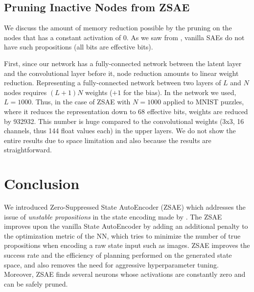 \subsection{Pruning Inactive Nodes from ZSAE}


We discuss the amount of memory reduction possible by the pruning on the nodes
that has a constant activation of 0. As we saw from ,
vanilla SAEs do not have such propositions (all bits are effective bits).

First, since our network has a fully-connected network between the
latent layer and the convolutional layer before it, node reduction
amounts to linear weight reduction.  Representing a fully-connected
network between two layers of $L$ and $N$ nodes requires $(L+1)N$
weights ($+1$ for the bias).
In the network we used, $L=1000$. Thus, in the case of ZSAE with $N=1000$ applied to MNIST puzzles,
where it reduces the representation down to 68 effective bits, weights are reduced by 932932.
This number is huge compared to the convolutional weights (3x3, 16 channels, thus 144 float values each) in the upper layers.
We do not show the entire results due to space limitation and also because the results are straightforward.


\section{Conclusion}
\label{conclusion}

We introduced Zero-Suppressed State AutoEncoder (ZSAE) which addresses
the issue of \emph{unstable propositions} in the state encoding made by
\latentplanner.
% 
The ZSAE improves upon the
vanilla State AutoEncoder \cite[SAE]{Asai2018} by
adding an additional penalty to the optimization metric of
the NN, which tries to minimize the number of true propositions
when encoding a raw state input such as images.
% 
ZSAE improves the success rate and the efficiency of planning performed on
the generated state space, and also removes the need for aggressive
hyperparameter tuning.
% 
Moreover, 
ZSAE finds several neurons whose activations are constantly zero
and can be safely pruned.

